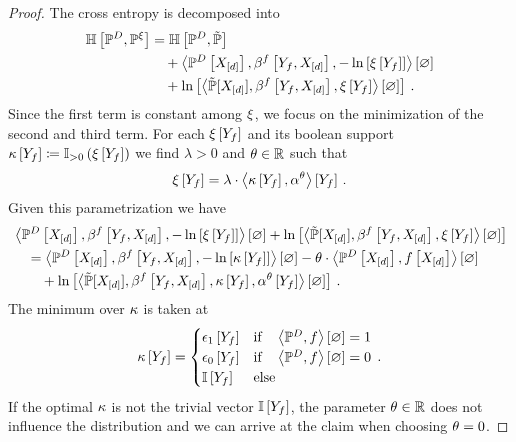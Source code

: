 \begin{proof}
    The cross entropy is decomposed into
    \begin{align*}
        \mathbb{H}\left[\mathbb{P}^{D},\mathbb{P}^{\xi}\right]
        &= \mathbb{H}\left[\mathbb{P}^{D},\tilde{\mathbb{P}}\right] \\
        &\quad + \left\langle \mathbb{P}^{D}\left[X_{[d]}\right],\beta^{f}\left[Y_{f},X_{[d]}\right],-\ln \left[ \xi\left[Y_{f}\right] \right]\right\rangle \left[ \varnothing \right] \\
        &\quad + \ln \left[ \left\langle \tilde{\mathbb{P}}[X_{[d]}],\beta^{f}\left[Y_{f},X_{[d]}\right],\xi\left[Y_{f}\right]\right\rangle \left[ \varnothing \right] \right]\, .
    \end{align*}
    Since the first term is constant among $\xi$, we focus on the minimization of the second and third term.
    For each $\xi\left[Y_{f}\right]$ and its boolean support $\kappa\left[Y_{f}\right]\coloneqq\mathbb{I}_{>0}\left(\xi\left[Y_{f}\right]\right)$ we find $\lambda>0$ and $\theta\in\mathbb{R}$ such that
    \begin{align*}
        \xi\left[Y_{f}\right]
        = \lambda\cdot\left\langle \kappa\left[Y_{f}\right],\alpha^\theta\right\rangle \left[ Y_{f} \right] \, .
    \end{align*}
    Given this parametrization we have
    \begin{align*}
        & \left\langle \mathbb{P}^{D}\left[X_{[d]}\right],\beta^{f}\left[Y_{f},X_{[d]}\right],-\ln \left[ \xi\left[Y_{f}\right] \right]\right\rangle \left[ \varnothing \right]
        + \ln \left[ \left\langle \tilde{\mathbb{P}}[X_{[d]}],\beta^{f}\left[Y_{f},X_{[d]}\right],\xi\left[Y_{f}\right]\right\rangle \left[ \varnothing \right] \right] \\
        & \quad  = \left\langle \mathbb{P}^{D}\left[X_{[d]}\right],\beta^{f}\left[Y_{f},X_{[d]}\right],-\ln \left[ \kappa\left[Y_{f}\right] \right]\right\rangle \left[ \varnothing \right] - \theta\cdot\left\langle \mathbb{P}^{D}\left[X_{[d]}\right],f\left[X_{[d]}\right]\right\rangle \left[ \varnothing \right] \\
        & \quad \quad  + \ln \left[ \left\langle \tilde{\mathbb{P}}[X_{[d]}],\beta^{f}\left[Y_{f},X_{[d]}\right],\kappa\left[Y_{f}\right],\alpha^\theta\left[Y_{f}\right]\right\rangle \left[ \varnothing \right] \right] \, .
    \end{align*}
    The minimum over $\kappa$ is taken at
    \begin{align*}
        \kappa\left[Y_{f}\right] =
        \begin{cases}
            \epsilon_{1}\left[Y_{f}\right] & \text{if}\quad \left\langle \mathbb{P}^{D},f\right\rangle \left[ \varnothing \right]=1 \\
            \epsilon_{0}\left[Y_{f}\right] & \text{if}\quad \left\langle \mathbb{P}^{D},f\right\rangle \left[ \varnothing \right]=0 \\
            \mathbb{I}\left[Y_{f}\right] & \text{else}
        \end{cases} \, .
    \end{align*}
    If the optimal $\kappa$ is not the trivial vector $\mathbb{I}\left[Y_{f}\right]$, the parameter $\theta\in\mathbb{R}$ does not influence the distribution and we can arrive at the claim when choosing $\theta=0$.

\end{proof}
